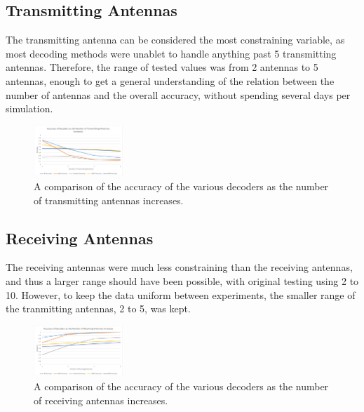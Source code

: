 \documentclass[conference]{IEEEtran}
\begin{document}
\subsection{Transmitting Antennas}
The transmitting antenna can be considered the most constraining variable, as most decoding methods were unablet to handle anything past 5 transmitting antennas. Therefore, the range of tested values was from 2 antennas to 5 antennas, enough to get a general understanding of the relation between the number of antennas and the overall accuracy, without spending several days per simulation.
\begin{figure}[h!]
    \centering
    \includegraphics[width=0.30\textwidth]{NtGraph.png}
    \caption{A comparison of the accuracy of the various decoders as the number of transmitting antennas increases.}
    \label{fig:NtGraph}
\end{figure}

\subsection{Receiving Antennas}
The receiving antennas were much less constraining than the receiving antennas, and thus a larger range should have been possible, with original testing using 2 to 10. However, to keep the data uniform between experiments, the smaller range of the tranmitting antennas, 2 to 5, was kept.
\begin{figure}[h!]
    \centering
    \includegraphics[width=0.30\textwidth]{NrGraph.png}
    \caption{A comparison of the accuracy of the various decoders as the number of receiving antennas increases.}
    \label{fig:NrGraph}
\end{figure}
\end{document}
